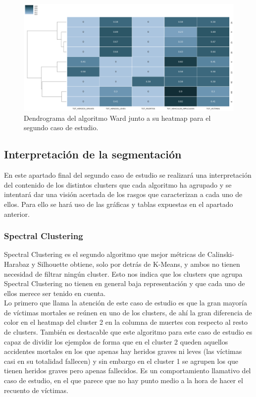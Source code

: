 	\begin{figure}[H]
		\centering
		\includegraphics[scale=0.4]{dendrograms/Ward-EarlyMorningAccidents-Dendrogram.png}
		\caption{Dendrograma del algoritmo Ward junto a su heatmap para el segundo caso de estudio.}
	\end{figure}
	
	\subsection{Interpretación de la segmentación}
	En este apartado final del segundo caso de estudio se realizará una interpretación del contenido de los distintos clusters que cada algoritmo ha agrupado y se intentará dar una visión acertada de los rasgos que caracterizan a cada uno de ellos. Para ello se hará uso de las gráficas y tablas expuestas en el apartado anterior.
	
	\subsubsection{Spectral Clustering}
	Spectral Clustering es el segundo algoritmo que mejor métricas de Calinski-Harabaz y Silhouette obtiene, solo por detrás de K-Means, y ambos no tienen necesidad de filtrar ningún cluster. Esto nos indica que los clusters que agrupa Spectral Clustering no tienen en general baja representación y que cada uno de ellos merece ser tenido en cuenta.\\
	
	Lo primero que llama la atención de este caso de estudio es que la gran mayoría de víctimas mortales se reúnen en uno de los clusters, de ahí la gran diferencia de color en el heatmap del cluster 2 en la columna de muertes con respecto al resto de clusters. También es destacable que este algoritmo para este caso de estudio es capaz de dividir los ejemplos de forma que en el cluster 2 queden aquellos accidentes mortales en los que apenas hay heridos graves ni leves (las víctimas casi en su totalidad fallecen) y sin embargo en el cluster 1 se agrupen los que tienen heridos graves pero apenas fallecidos. Es un comportamiento llamativo del caso de estudio, en el que parece que no hay punto medio a la hora de hacer el recuento de víctimas.\\
	
